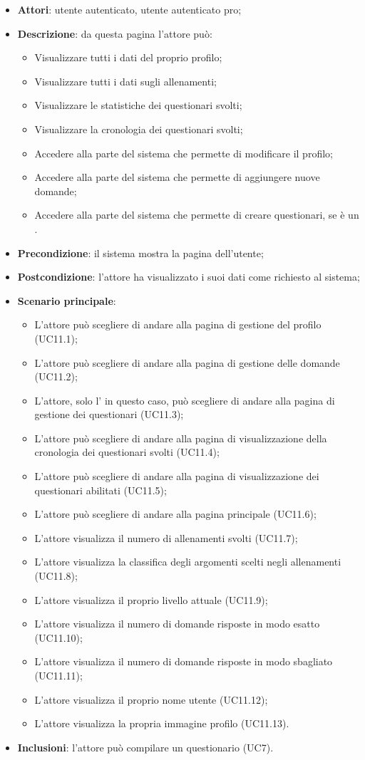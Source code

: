 \begin{itemize}
\item\textbf{Attori}: utente autenticato, utente autenticato pro;
\item\textbf{Descrizione}: da questa pagina l'attore può: 
\begin{itemize}
	\item Visualizzare tutti i dati del proprio profilo;
	\item Visualizzare tutti i dati sugli allenamenti;
	\item Visualizzare le statistiche dei questionari svolti;
	\item Visualizzare la cronologia dei questionari svolti;
	\item Accedere alla parte del sistema che permette di modificare il profilo;
	\item Accedere alla parte del sistema che permette di aggiungere nuove domande;
	\item Accedere alla parte del sistema che permette di creare questionari, se è un \uaupro{}.
\end{itemize}
\item\textbf{Precondizione}: il sistema mostra la pagina dell'utente;
\item\textbf{Postcondizione}: l'attore ha visualizzato i suoi dati come richiesto al sistema;
\item\textbf{Scenario principale}:
\begin{itemize}
\item L'attore può scegliere di andare alla pagina di gestione del profilo (UC11.1);
\item L'attore può scegliere di andare alla pagina di gestione delle domande (UC11.2);  
\item L'attore, solo l'\uaupro{} in questo caso, può scegliere di andare alla pagina di gestione dei questionari (UC11.3);
\item L'attore può scegliere di andare alla pagina di visualizzazione della cronologia dei questionari svolti (UC11.4);
\item L'attore può scegliere di andare alla pagina di visualizzazione dei questionari abilitati (UC11.5);
\item L'attore può scegliere di andare alla pagina principale (UC11.6);
\item L'attore visualizza il numero di allenamenti svolti (UC11.7);
\item L'attore visualizza la classifica degli argomenti scelti negli allenamenti (UC11.8);
\item L'attore visualizza il proprio livello attuale (UC11.9);
\item L'attore visualizza il numero di domande risposte in modo esatto (UC11.10);
\item L'attore visualizza il numero di domande risposte in modo sbagliato (UC11.11);
\item L'attore visualizza il proprio nome utente (UC11.12);
\item L'attore visualizza la propria immagine profilo (UC11.13).
\end{itemize}
\item\textbf{Inclusioni}: l'attore può compilare un questionario (UC7).
\end{itemize}

